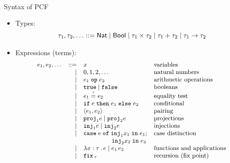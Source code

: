 \documentclass[paper=screen,mode=present,style=zysimple]{powerdot}
\begin{document}
\begin{slide}{Syntax of PCF}
\begin{itemize}
\item Types:
\[
\tau_1, \tau_2, \ldots ::= \tnat \mid \tbool \mid \tau_1 \times \tau_2 \mid \tau_1 + \tau_2 \mid \tau_1 \to \tau_2
\vspace*{-2em}
\]
\item Expressions (terms): \vspace*{-0.5em}
\[\small
\begin{array}{lrll}
e_1, e_2, \ldots & ::= &
x & \mbox{variables} 
\\ & \mid & 
0, 1, 2,  \ldots & \mbox{natural numbers}
\\ & \mid & 
e_1 \; \mathtt{op} \; e_2 & \mbox{arithmetic operations} 
\\ & \mid & 
\mathtt{true} \mid \mathtt{false} & \mbox{booleans}
\\ & \mid & 
e_1 \stackrel{\mbox{\tiny ?}}{=} e_2 & \mbox{equality test} 
\\ & \mid & 
\mathtt{if} \; {e} \; \mathtt{then} \; {e_1} \; \mathtt{else} \; {e_2} & \mbox{conditional}
\\ & \mid & 
\langle{e_1, e_2}\rangle & \mbox{pairing}
\\ & \mid & 
\mathtt{proj}_1 e \mid \mathtt{proj}_2 e & \mbox{projections}
\\ & \mid & 
\mathtt{inj}_1 e \mid \mathtt{inj}_2 e & \mbox{injections}
\\ & \mid & 
\mathtt{case} \; e \; \mathtt{of} \; \mathtt{inj}_1 x_1 \; \mathtt{in} \; e_1 ; 
& \mbox{case distinction}
\\ & & \hspace*{4.5em}
\mathtt{inj}_2 x_2 \; \mathtt{in} \; e_2 & 
\\ & \mid & 
\lambda x : \tau \, . \, e \mid e_1 \, e_2 & \mbox{functions and applications}
\\ & \mid & 
\mathtt{fix}\,_\tau & \mbox{recursion (fix point)}
\end{array}
\]
\end{itemize}
\end{slide}
\end{document}
